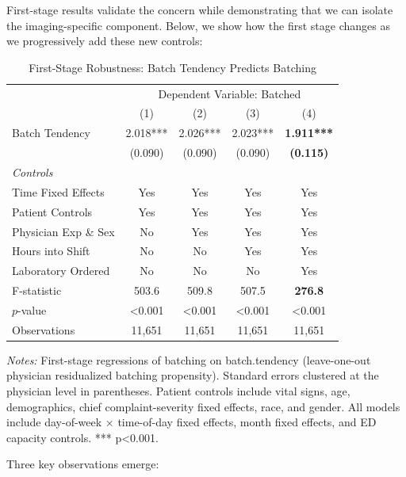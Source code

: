 \documentclass[11pt]{article}
\newcommand{\1}{\hbox{\rm 1\kern-.35em 1}}
\begin{document}
First-stage results validate the concern while demonstrating that we can isolate the imaging-specific component. Below, we show how the first stage changes as we progressively add these new controls:

\begin{table}[ht]
\centering
\caption*{First-Stage Robustness: Batch Tendency Predicts Batching}
\label{tab:first_stage_robustness}
\begin{threeparttable}
\begin{tabular}{lcccc}
\toprule 
& \multicolumn{4}{c}{Dependent Variable: Batched}\\
\cmidrule(lr){2-5}
& (1) & (2) & (3) & (4) \\
\midrule
Batch Tendency & 2.018*** & 2.026*** & 2.023*** & \textbf{1.911***} \\ 
& (0.090) & (0.090) & (0.090) & \textbf{(0.115)} \\
\midrule
\textit{Controls} \\
Time Fixed Effects & Yes & Yes & Yes & Yes \\
Patient Controls & Yes & Yes & Yes & Yes \\
Physician Exp \& Sex & No & Yes & Yes & Yes \\
Hours into Shift & No & No & Yes & Yes \\
Laboratory Ordered & No & No & No & Yes \\
\midrule
F-statistic & 503.6 & 509.8 & 507.5 & \textbf{276.8} \\
$p$-value & <0.001 & <0.001 & <0.001 & <0.001 \\
Observations & 11,651 & 11,651 & 11,651 & 11,651 \\
\bottomrule
\end{tabular}
\begin{tablenotes}
\footnotesize
\item \textit{Notes:} First-stage regressions of batching on batch.tendency (leave-one-out physician residualized batching propensity). Standard errors clustered at the physician level in parentheses. Patient controls include vital signs, age, demographics, chief complaint-severity fixed effects, race, and gender. All models include day-of-week × time-of-day fixed effects, month fixed effects, and ED capacity controls. *** p<0.001.
\end{tablenotes}
\end{threeparttable}
\end{table}

Three key observations emerge:
\end{document}
